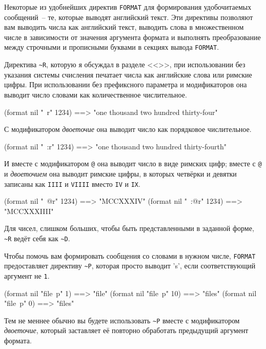 Некоторые из удобнейших директив \lstinline{FORMAT} для формирования удобочитаемых
сообщений~-- те, которые выводят английский текст. Эти директивы позволяют вам выводить
числа как английский текст, выводить слова в множественном числе в зависимости от значения
аргумента формата и выполнять преобразование между строчными и прописными буквами в
секциях вывода \lstinline{FORMAT}.

Директива \lstinline!~R!, которую я обсуждал в разделе <<>>,
при использовании без указания системы счисления печатает числа как английские слова или
римские цифры. При использовании без префиксного параметра и модификаторов она выводит
число словами как количественное числительное.

\begin{myverb}
(format nil "~r" 1234) ==> "one thousand two hundred thirty-four"
\end{myverb}

С модификатором \textit{двоеточие} она выводит число как порядковое числительное.

\begin{myverb}
(format nil "~:r" 1234) ==> "one thousand two hundred thirty-fourth"
\end{myverb}

И вместе с модификатором \lstinline!@! она выводит число в виде римских цифр; вместе с
\lstinline!@! и \textit{двоеточием} она выводит римские цифры, в которых четвёрки и
девятки записаны как \lstinline{IIII} и \lstinline{VIIII} вместо \lstinline{IV} и \lstinline{IX}.

\begin{myverb}
(format nil "~@r" 1234)  ==> "MCCXXXIV"
(format nil "~:@r" 1234) ==> "MCCXXXIIII"
\end{myverb}

Для чисел, слишком больших, чтобы быть представленными в заданной форме, \lstinline!~R!
ведёт себя как \lstinline!~D!.

Чтобы помочь вам формировать сообщения со словами в нужном числе, \lstinline{FORMAT}
предоставляет директиву \lstinline!~P!, которая просто выводит 's', если соответствующий
аргумент не \lstinline{1}.

\begin{myverb}
(format nil "file~p" 1)  ==> "file"
(format nil "file~p" 10) ==> "files"
(format nil "file~p" 0)  ==> "files"
\end{myverb}

Тем не меннее обычно вы будете использовать \lstinline!~P! вместе с модификатором
\textit{двоеточие}, который заставляет её повторно обработать предыдущий аргумент формата.

